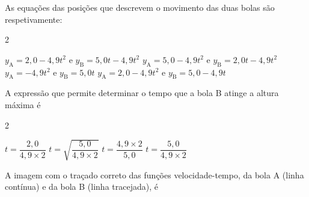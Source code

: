 \documentclass[addpoints, answers]{exam}
\begin{document}
\begin{questions}
{		\vspace{5pt} 
		\begin{minipage}{\linewidth}
			\vspace{3pt}
			\centering
		\end{minipage}
		
		}
		
		\vspace{5pt}
		\question[10] As equações das posições que descrevem o movimento das duas bolas são respetivamente:
		
		\begin{multicols}{2}
			\begin{choices}
				\correctchoice $y_{\text{A}} = 2,0 - 4,9 t^2$ e $y_{\text{B}} = 5,0 t - 4,9 t^2$
				\choice $y_{\text{A}} = 5,0 - 4,9 t^2$ e $y_{\text{B}} = 2,0 t - 4,9 t^2$
				\choice $y_{\text{A}} = - 4,9 t^2$ e $y_{\text{B}} = 5,0 t$
				\choice $y_{\text{A}} = 2,0 - 4,9 t^2$ e $y_{\text{B}} = 5,0 - 4,9 t$
			\end{choices}
		\end{multicols}
		
		\vspace{5pt}
		\question[10] A expressão que permite determinar o tempo que a bola B atinge a altura máxima é\\
		\begin{multicols}{2}
			\begin{choices}
				\choice $t = \dfrac{2,0}{4,9 \times 2}$
				\choice $t = \sqrt{\dfrac{5,0}{4,9 \times 2}}$
				\choice $t = \dfrac{4,9 \times 2}{5,0}$
				\correctchoice $t = \dfrac{5,0}{4,9 \times 2}$
			\end{choices}
		\end{multicols}
		
		\vspace{5pt}
		\question[10] A imagem com o traçado correto das funções velocidade-tempo, da bola A (linha contínua) e da bola B (linha tracejada), é
		

\end{questions}
\end{document}
